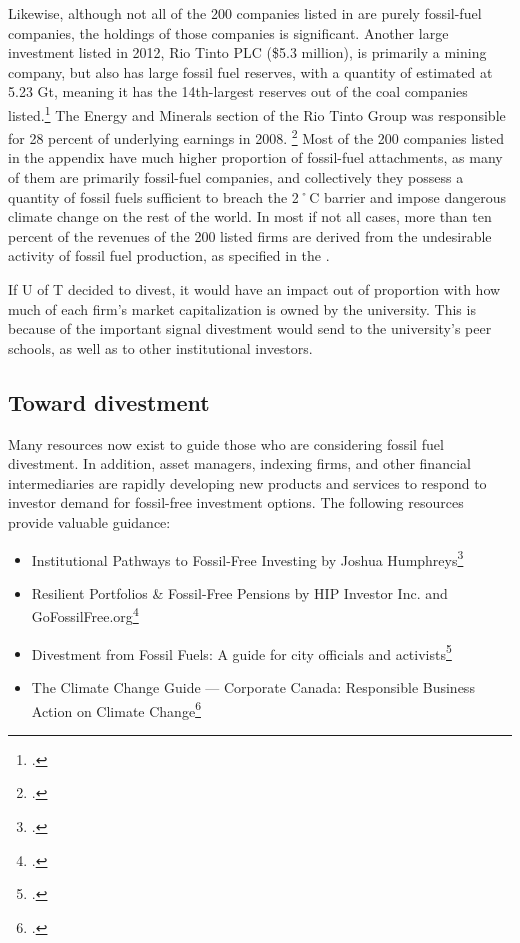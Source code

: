 \documentclass[10pt]{article}
\begin{document}
Likewise, although not all of the 200 companies listed in  are purely fossil-fuel companies, the holdings of those companies is significant.
Another large investment listed in 2012, Rio Tinto PLC (\$5.3 million), is primarily a mining company, but also has large fossil fuel reserves, with a  quantity of  estimated at 5.23 Gt, meaning it has the 14th-largest reserves out of the coal companies listed.\footcite{CTI2012}
The Energy and Minerals section of the Rio Tinto Group was responsible for 28 percent of underlying earnings in 2008. \footcite{RioTintoChartbook}
Most of the 200 companies listed in the appendix have much higher proportion of fossil-fuel attachments, as many of them are primarily fossil-fuel companies, and collectively they possess a quantity of fossil fuels sufficient to breach the 2˚C barrier and impose dangerous climate change on the rest of the world.
In most if not all cases, more than ten percent of the revenues of the 200 listed firms are derived from the undesirable activity of fossil fuel production, as specified in the .



If U of T decided to divest, it would have an impact out of proportion with how much of each firm's market capitalization is owned by the university.
This is because of the important signal divestment would send to the university's peer schools, as well as to other institutional investors.



		\subsection{Toward divestment}



Many resources now exist to guide those who are considering fossil fuel divestment. 
In addition, asset managers, indexing firms, and other financial intermediaries are rapidly developing new products and services to respond to investor demand for fossil-free investment options.
The following resources provide valuable guidance:
\begin{itemize}
	\item Institutional Pathways to Fossil-Free Investing by Joshua Humphreys\footcite[][]{FossilFreeInvesting}
	\item Resilient Portfolios \& Fossil-Free Pensions by HIP Investor Inc. and GoFossilFree.org\footcite[][]{ResPortFFPensions}
	\item Divestment from Fossil Fuels: A guide for city officials and activists\footcite[][]{MayorsInnovationDivestGuide}
	\item The Climate Change Guide --- Corporate Canada: Responsible Business Action on Climate Change\footcite[][]{CanadianBusinessSR2007}
\end{itemize}
\end{document}
